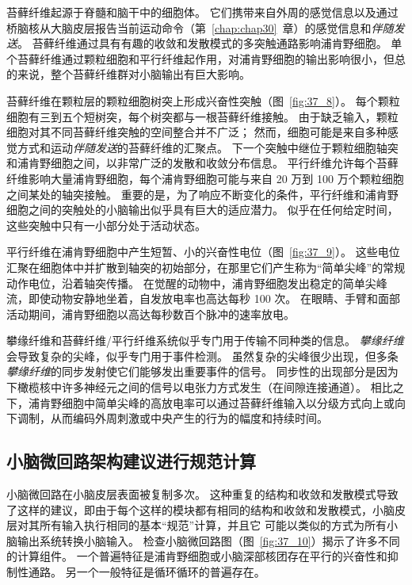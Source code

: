 苔藓纤维起源于脊髓和脑干中的细胞体。
它们携带来自外周的感觉信息以及通过桥脑核从大脑皮层报告当前运动命令（第~\ref{chap:chap30}~章）的感觉信息和\textit{伴随发送}。
苔藓纤维通过具有有趣的收敛和发散模式的多突触通路影响浦肯野细胞。
单个苔藓纤维通过颗粒细胞和平行纤维起作用，对浦肯野细胞的输出影响很小，但总的来说，整个苔藓纤维群对小脑输出有巨大影响。


苔藓纤维在颗粒层的颗粒细胞树突上形成兴奋性突触（图~\ref{fig:37_8}）。
每个颗粒细胞有三到五个短树突，每个树突都与一根苔藓纤维接触。
由于缺乏输入，颗粒细胞对其不同苔藓纤维突触的空间整合并不广泛；
然而，细胞可能是来自多种感觉方式和运动\textit{伴随发送}的苔藓纤维的汇聚点。
下一个突触中继位于颗粒细胞轴突和浦肯野细胞之间，以非常广泛的发散和收敛分布信息。
平行纤维允许每个苔藓纤维影响大量浦肯野细胞，每个浦肯野细胞可能与来自 20 万到 100 万个颗粒细胞之间某处的轴突接触。
重要的是，为了响应不断变化的条件，平行纤维和浦肯野细胞之间的突触处的小脑输出似乎具有巨大的适应潜力。
似乎在任何给定时间，这些突触中只有一小部分处于活动状态。


平行纤维在浦肯野细胞中产生短暂、小的兴奋性电位（图~\ref{fig:37_9}）。
这些电位汇聚在细胞体中并扩散到轴突的初始部分，在那里它们产生称为“简单尖峰”的常规动作电位，沿着轴突传播。
在觉醒的动物中，浦肯野细胞发出稳定的简单尖峰流，即使动物安静地坐着，自发放电率也高达每秒 100 次。
在眼睛、手臂和面部活动期间，浦肯野细胞以高达每秒数百个脉冲的速率放电。


攀缘纤维和苔藓纤维/平行纤维系统似乎专门用于传输不同种类的信息。
\textit{攀缘纤维}会导致复杂的尖峰，似乎专门用于事件检测。
虽然复杂的尖峰很少出现，但多条\textit{攀缘纤维}的同步发射使它们能够发出重要事件的信号。
同步性的出现部分是因为下橄榄核中许多神经元之间的信号以电张力方式发生（在间隙连接通道）。
相比之下，浦肯野细胞中简单尖峰的高放电率可以通过苔藓纤维输入以分级方式向上或向下调制，从而编码外周刺激或中央产生的行为的幅度和持续时间。


\subsection{小脑微回路架构建议进行规范计算}

小脑微回路在小脑皮层表面被复制多次。
这种重复的结构和收敛和发散模式导致了这样的建议，即由于每个这样的模块都有相同的结构和收敛和发散模式，小脑皮层对其所有输入执行相同的基本“规范”计算，并且它 可能以类似的方式为所有小脑输出系统转换小脑输入。
检查小脑微回路图（图~\ref{fig:37_10}）揭示了许多不同的计算组件。
一个普遍特征是浦肯野细胞或小脑深部核团存在平行的兴奋性和抑制性通路。
另一个一般特征是循环循环的普遍存在。


